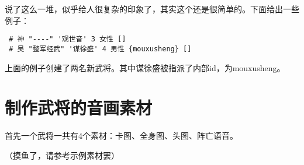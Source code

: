 说了这么一堆，似乎给人很复杂的印象了，其实这个还是很简单的。下面给出一些例子：

\begin{verbatim}
 # 神 "----" '观世音' 3 女性 []
 # 吴 "整军经武" '谋徐盛' 4 男性 {mouxusheng} []
\end{verbatim}

上面的例子创建了两名新武将。其中谋徐盛被指派了内部id，为mouxusheng。\\


\section{制作武将的音画素材}

首先一个武将一共有4个素材：卡图、全身图、头图、阵亡语音。

（摸鱼了，请参考示例素材罢）
